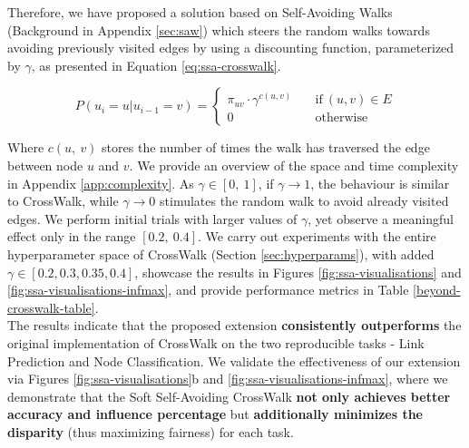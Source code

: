 Therefore, we have proposed a solution based on Self-Avoiding Walks \cite{saw} (Background in Appendix \ref{sec:saw}) which steers the random walks towards avoiding previously visited edges by using a discounting function, parameterized by $\gamma$, as presented in Equation \ref{eq:ssa-crosswalk}. 

\begin{equation}
P(u_i = u \lvert u_{i-1} = v) = \left\{
        \begin{array}{ll}
            \pi_{uv} \cdot \gamma^{c(u,v)}  & \quad \text{if} \ (u, v) \in E \\
            0 & \quad \text{otherwise}
        \end{array}
    \right.
\label{eq:ssa-crosswalk}
\end{equation}
\vspace{1mm}


Where $c(u, \ v)$ stores the number of times the walk has traversed the edge between node $u$ and $v$. We provide an overview of the space and time complexity in Appendix \ref{app:complexity}. As $\gamma \in [0, \ 1]$, if $\gamma \rightarrow 1$, the behaviour is similar to CrossWalk, while $\gamma \rightarrow 0$ stimulates the random walk to avoid already visited edges.  We perform initial trials with larger values of $\gamma$, yet observe a meaningful effect only in the range $[0.2, \ 0.4]$. We carry out experiments with the entire hyperparameter space of CrossWalk (Section \ref{sec:hyperparams}), with added $\gamma \in [0.2, 0.3, 0.35, 0.4]$, showcase the results in Figures \ref{fig:ssa-visualisations} and \ref{fig:ssa-visualisations-infmax}, and provide performance metrics in Table \ref{beyond-crosswalk-table}. \\

The results indicate that the proposed extension \textbf{consistently outperforms} the original implementation of CrossWalk on the two reproducible tasks - Link Prediction and Node Classification. We validate the effectiveness of our extension via Figures \ref{fig:ssa-visualisations}b and \ref{fig:ssa-visualisations-infmax}, where we demonstrate that the Soft Self-Avoiding CrossWalk \textbf{not only achieves better accuracy and influence percentage} but \textbf{additionally minimizes the disparity} (thus maximizing fairness) for each task.




